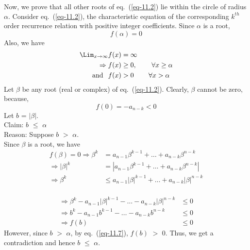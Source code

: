 \begin{multicols}{2}
Now, we prove that all other roots of eq.~(\ref{eq-11.2}) lie within the circle of radius $\alpha$. Consider eq.~(\ref{eq-11.2}), the characteristic equation of the corresponding $k^{th}$ order recurrence relation with positive integer coefficients. Since $\alpha$ is a root, 
   \begin{equation*}
     f(\alpha) = 0
   \end{equation*}
Also, we have
 \begin{align}
  \displaystyle{\Lim_{x\rightarrow \infty}} f(x) &= \infty \nonumber\\
  \Rightarrow   f(x) &\ge 0, \hspace{0.3in} \forall x \ge \alpha \label{eq-11.6}\\
  \textup{and}\hspace{0.1in} f(x) &> 0  \hspace{0.3in} \forall x > \alpha \label{eq-11.7}          
 \end{align}
Let $\beta$ be any root (real or complex) of eq.~(\ref{eq-11.2}). Clearly, $\beta$ cannot be zero, because,
 \begin{equation}\nonumber
 f(0) = -a_{n-k} < 0
  \end{equation}
Let $b$ = $|\beta|$.\\
Claim: $b$ $\le$ $\alpha$\\
Reason: Suppose $b$ $>$ $\alpha$.\\
 Since $\beta$ is a root, we have
 \begin{align*}
 f(\beta) = 0 \Rightarrow \beta^{k}  &=  a_{n-1}\beta^{k-1} + \ldots + a_{n-k}\beta^{n-k} \nonumber\\
              \Rightarrow |\beta|^{k}  &=  |a_{n-1}\beta^{k-1} + \ldots + a_{n-k}\beta^{n-k}|\nonumber\\
             \Rightarrow \beta^{k}  &\leq  a_{n-1}|\beta|^{k-1} + \ldots + a_{n-k}|\beta|^{n-k}\nonumber\\
   \end{align*}
   
   \vspace{-1.5cm}
   
   \begin{align}
              \Rightarrow \beta^{k}-a_{n-1}|\beta|^{k-1} - \ldots - a_{n-k}|\beta|^{n-k} &\leq 0 \nonumber\\
              \Rightarrow b^{k}-a_{n-1}b^{k-1} - \ldots - a_{n-k}b^{n-k} &\leq 0 \nonumber\\
  \Rightarrow f(b) &\leq 0\label{eq-11.8} 
 \end{align}
However, since $b$ $>$ $\alpha$, by eq.~(\ref{eq-11.7}), $f(b)$ $>$ 0. Thus, we get a contradiction and hence $b$ $\le$ $\alpha$.


\end{multicols}
